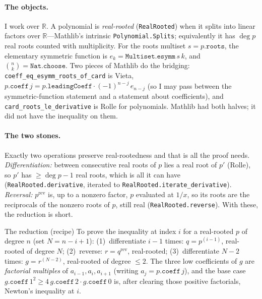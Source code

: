 \documentclass[11pt]{article}
\newcommand{\lean}[1]{\texttt{#1}}
\newcommand{\R}{\mathbb{R}}
\begin{document}
\paragraph{The objects.} I work over $\R$. A polynomial is \emph{real-rooted}
(\lean{RealRooted}) when it splits into linear factors over $\R$---Mathlib's intrinsic
\lean{Polynomial.Splits}; equivalently it has $\deg p$ real roots counted with multiplicity. For
the roots multiset $s=p.\mathtt{roots}$, the elementary symmetric function is
$e_k=\lean{Multiset.esymm}\,s\,k$, and $\binom{n}{k}=\lean{Nat.choose}$. Two pieces of Mathlib do
the bridging: \lean{coeff\_eq\_esymm\_roots\_of\_card} is Vieta,
$p.\mathtt{coeff}\,j=p.\mathtt{leadingCoeff}\cdot(-1)^{n-j}\,e_{n-j}$ (so I may pass between the
symmetric-function statement and a statement about coefficients), and
\lean{card\_roots\_le\_derivative} is Rolle for polynomials. Mathlib had both halves; it did not
have the inequality on them.

\paragraph{The two stones.} Exactly two operations preserve real-rootedness and that is all the
proof needs. \emph{Differentiation:} between consecutive real roots of $p$ lies a real root of
$p'$ (Rolle), so $p'$ has $\ge\deg p-1$ real roots, which is all it can have
(\lean{RealRooted.derivative}, iterated to \lean{RealRooted.iterate\_derivative}).
\emph{Reversal:} $p^{\mathrm{rev}}$ is, up to a nonzero factor, $p$ evaluated at $1/x$, so its
roots are the reciprocals of the nonzero roots of $p$, still real (\lean{RealRooted.reverse}).
With these, the reduction is short.

\begin{recipebox}{The reduction (recipe)}
To prove the inequality at index $i$ for a real-rooted $p$ of degree $n$ (set $N=n-i+1$):
(1)~differentiate $i-1$ times: $q=p^{(i-1)}$, real-rooted of degree $N$;
(2)~reverse: $r=q^{\mathrm{rev}}$, real-rooted;
(3)~differentiate $N-2$ times: $g=r^{(N-2)}$, real-rooted of degree $\le2$.
The three low coefficients of $g$ are \emph{factorial multiples} of $a_{i-1},a_i,a_{i+1}$ (writing
$a_j=p.\mathtt{coeff}\,j$), and the base case
$g.\mathtt{coeff}\,1^2\ge4\,g.\mathtt{coeff}\,2\cdot g.\mathtt{coeff}\,0$ is, after clearing those
positive factorials, Newton's inequality at $i$.
\end{recipebox}
\end{document}
